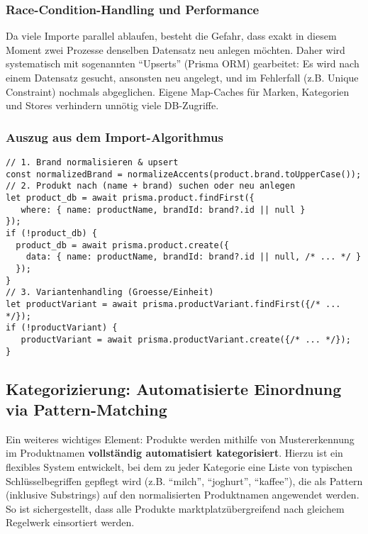 \subsubsection{Race-Condition-Handling und Performance}
Da viele Importe parallel ablaufen, besteht die Gefahr, dass exakt in diesem Moment zwei Prozesse denselben Datensatz neu anlegen möchten. Daher wird systematisch mit sogenannten "`Upserts"' (Prisma ORM) gearbeitet: Es wird nach einem Datensatz gesucht, ansonsten neu angelegt, und im Fehlerfall (z.B. Unique Constraint) nochmals abgeglichen. Eigene Map-Caches für Marken, Kategorien und Stores verhindern unnötig viele DB-Zugriffe.

\subsubsection{Auszug aus dem Import-Algorithmus}
\begin{lstlisting}[style=typescriptstyle, caption={Produkt-Import: Algorithmus bei Name-Matching und DB-Schreibvorgang}]
// 1. Brand normalisieren & upsert
const normalizedBrand = normalizeAccents(product.brand.toUpperCase());
// 2. Produkt nach (name + brand) suchen oder neu anlegen
let product_db = await prisma.product.findFirst({
   where: { name: productName, brandId: brand?.id || null }
});
if (!product_db) {
  product_db = await prisma.product.create({
    data: { name: productName, brandId: brand?.id || null, /* ... */ }
  });
}
// 3. Variantenhandling (Groesse/Einheit)
let productVariant = await prisma.productVariant.findFirst({/* ... */});
if (!productVariant) {
   productVariant = await prisma.productVariant.create({/* ... */});
}
\end{lstlisting}

\subsection{Kategorizierung: Automatisierte Einordnung via Pattern-Matching}

Ein weiteres wichtiges Element: Produkte werden mithilfe von Mustererkennung im Produktnamen \textbf{vollständig automatisiert kategorisiert}. Hierzu ist ein flexibles System entwickelt, bei dem zu jeder Kategorie eine Liste von typischen Schlüsselbegriffen gepflegt wird (z.B. "`milch"', "`joghurt"', "`kaffee"'), die als Pattern (inklusive Substrings) auf den normalisierten Produktnamen angewendet werden. So ist sichergestellt, dass alle Produkte marktplatzübergreifend nach gleichem Regelwerk einsortiert werden.

